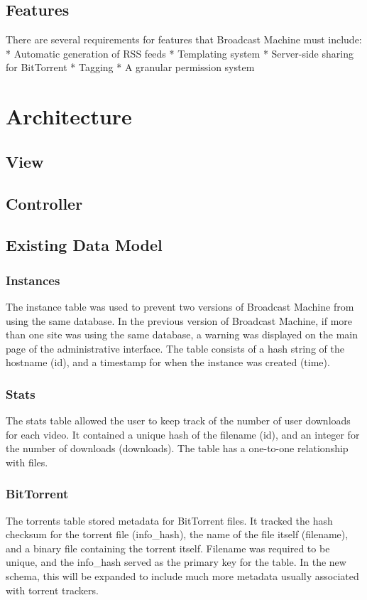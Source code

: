 \documentclass[a4paper,12pt]{report}
\begin{document}
\section{Features}
There are several requirements for features that Broadcast Machine must include:
 * Automatic generation of RSS feeds
 * Templating system
 * Server-side sharing for BitTorrent
 * Tagging
 * A granular permission system

\chapter{Architecture}

\section{View}

\section{Controller}

\section{Existing Data Model}

\subsection{Instances}
	The instance table was used to prevent two versions of Broadcast Machine from using the same database. In the previous version of Broadcast Machine, if more than one site was using the same database, a warning was displayed on the main page of the administrative interface. The table consists of a hash string of the hostname (id), and a timestamp for when the instance was created (time). 

\subsection{Stats}
	The stats table allowed the user to keep track of the number of user downloads for each video. It contained a unique hash of the filename (id), and an integer for the number of downloads (downloads). The table has a one-to-one relationship with files.

\subsection{BitTorrent}
	The torrents table stored metadata for BitTorrent files. It tracked the hash checksum for the torrent file (info\_hash), the name of the file itself (filename), and a binary file containing the torrent itself. Filename was required to be unique, and the info_hash served as the primary key for the table. In the new schema, this will be expanded to include much more metadata usually associated with torrent trackers.
\end{document}
